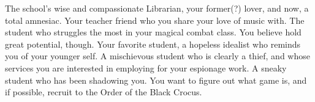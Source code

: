 \documentclass[char]{GL2020}
\begin{document}
\begin{contacts}
    \contact{\cLibrarian{}} The school’s wise and compassionate Librarian, your former(?) lover, and now, a total amnesiac. 
    \contact{\cMusic{}} Your teacher friend who you share your love of music with.
    \contact{\cAdopted{}} The student who struggles the most in your magical combat class. You believe \cAdopted{\they} hold\cAdopted{\verbs} great potential, though.
    \contact{\cDisney{}} Your favorite student, a hopeless idealist who reminds you of your younger self.
    \contact{\cPirateChild{}} A mischievous student who is clearly a thief, and whose services you are interested in employing for your espionage work.
    \contact{\cLibAssist{}} A sneaky student who has been shadowing you. You want to figure out what \cLibAssist{\their} game is, and if possible, recruit \cLibAssist{\them} to the Order of the Black Crocus.
\end{contacts}
\end{document}
